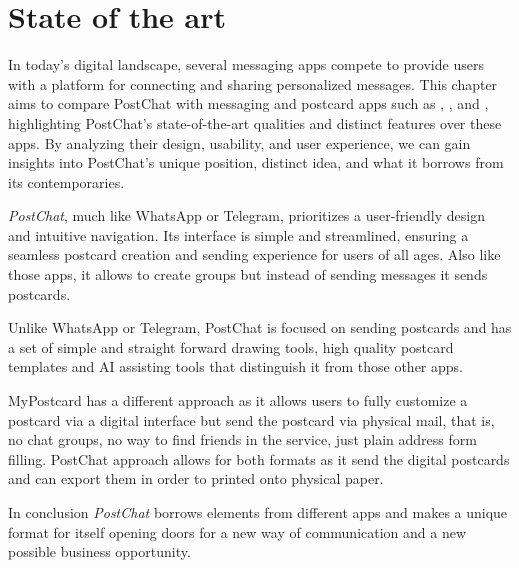 
\chapter{State of the art} 
\label{ch:Chapter2}
\vfill \newpage

In today's digital landscape, several messaging apps compete to provide users with a platform for connecting and sharing personalized messages. This chapter aims to compare PostChat with messaging and postcard apps such as \textit{\cite{WhatsApp}}, \textit{\cite{Telegram}}, and \textit{\cite{MyPostcard}}, highlighting PostChat's state-of-the-art qualities and distinct features over these apps. By analyzing their design, usability, and user experience, we can gain insights into PostChat's unique position, distinct idea, and what it borrows from its contemporaries.


\textit{PostChat}, much like WhatsApp or Telegram, prioritizes a user-friendly design and intuitive navigation. Its interface is simple and streamlined, ensuring a seamless postcard creation and sending experience for users of all ages. Also like those apps, it allows to create groups but instead of sending messages it sends postcards.

Unlike WhatsApp or Telegram, PostChat is focused on sending postcards and has a set of simple and straight forward drawing tools, high quality postcard templates and AI assisting tools that distinguish it from those other apps. 

MyPostcard has a different approach as it allows users to fully customize a postcard via a digital interface but send the postcard via physical mail, that is, no chat groups, no way to find friends in the service, just plain address form filling. PostChat approach allows for both formats as it send the digital postcards and can export them in order to printed onto physical paper.

In conclusion \textit{PostChat} borrows elements from different apps and makes a unique 
format for itself opening doors for a new way of communication and a new possible business 
opportunity.